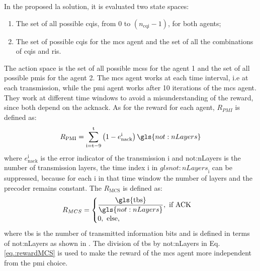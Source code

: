 In the proposed \gls{la} solution, it is evaluated two state spaces:
\begin{enumerate}
    \item The set of all possible \gls{cqi}s, from $0$ to $(n_{\text{cqi}}-1)$, for both agents;
    \item The set of possible \glspl{cqi} for the \gls{mcs} agent and the set of all the combinations of \glspl{cqi} and \glspl{ri}.
\end{enumerate}
%
The action space is the set of all possible \gls{mcs}s for the agent 1 and the set of all possible \gls{pmi}s for the agent 2.
%
The \gls{mcs} agent works at each time interval, i.e at each transmission, while the \gls{pmi} agent works after 10 iterations of the \gls{mcs} agent.
%
They work at different time windows to avoid a misunderstanding of the reward, since both depend on the \gls{acknack}.
%
As for the reward for each agent, $R_{PMI}$ is defined as:
%
\begin{equation}\label{eq.:rewardPMI}
R_{\text{PMI}} = \sum_{\textrm{i}=\textrm{t}-9}^\textrm{t} \left( 1- e_{\text{nack}}^\textrm{i} \right) \gls{not:nLayers}
\end{equation}
%
\noindent where $e_{\text{nack}}^\textrm{i}$ is the error indicator of the transmission $\textrm{i}$ and \gls{not:nLayers} is the number of transmission layers, the time index $\textrm{i}$ in $gls{not:nLayers}_\textrm{i}$ can be suppressed, because for each $\textrm{i}$ in that time window the number of layers and the precoder remains constant.
%
The $R_{\text{MCS}}$ is defined as:
\begin{equation}\label{eq.:rewardMCS}
R_{MCS} = \begin{cases}
\dfrac{\textrm{\gls{tbs}}}{\gls{not:nLayers}}, \text{ if ACK} \\
0, \text{ else,}
\end{cases}
\end{equation}
\noindent where \gls{tbs} is the number of transmitted information bits and is defined in terms of \gls{not:nLayers} as shown in \cite{3gpp.38.214}.
%
The division of \gls{tbs} by \gls{not:nLayers} in Eq. \eqref{eq.:rewardMCS} is used to make the reward of the \gls{mcs} agent more independent from the \gls{pmi} choice.
%




